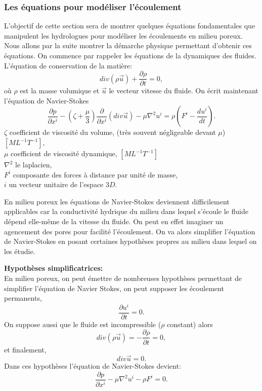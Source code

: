 \documentclass[a4paper,11pt]{article}
\numberwithin{equation}{section}
\begin{document}
\subsubsection{Les équations pour modéliser l'écoulement}
\label{ch: eq meca-flu}
L'objectif de cette section sera de montrer quelques équations fondamentales que manipulent les hydrologues pour modéliser les écoulements en milieu poreux. Nous allons par la suite montrer la démarche physique permettant d'obtenir ces équations. On commence par rappeler les équations de la dynamiques des fluides. L'équation de conservation de la matière:
\begin{equation}
	\label{cons-mat}
	div(\rho \overrightarrow{u})+\frac{\partial \rho}{\partial t}=0,
\end{equation}
où $\rho$ est la masse volumique et $\overrightarrow{u}$ le vecteur vitesse du fluide. On écrit maintenant l'équation de Navier-Stokes
\begin{equation}
	\frac{\partial p}{\partial x^i}-(\zeta+\frac{\mu}{3})\frac{\partial}{\partial x^i}(div\overrightarrow{u}) - \mu \nabla^2u^i=\rho(F^i -\frac{du^i}{dt}).
\end{equation}
$\zeta$ coefficient de viscosité du volume, (très souvent négligeable devant $\mu$) $[ML^{-1}T^{-1}]$,\\
$\mu$ coefficient de viscosité dynamique, $[ML^{-1}T^{-1}]$\\
$\nabla^2$ le laplacien,\\
$F^i$ composante des forces à distance par unité de masse,\\
$i$ un vecteur unitaire de l'espace $3D$.

En milieu poreux les équations de Navier-Stokes deviennent difficilement applicables car la conductivité hydrique du milieu dans lequel s'écoule le fluide dépend elle-même de la vitesse du fluide. On peut en effet imaginer un agencement des pores pour facilité l'écoulement. On va alors simplifier l'équation de Navier-Stokes en posant certaines hypothèses propres au milieu dans lequel on les étudie. 

\vspace{0.7cm}

\noindent \textbf{Hypothèses simplificatrices:}\\
En milieu poreux, on peut émettre de nombreuses hypothèses permettant de simplifier l'équation de Navier Stokes, on peut supposer les écoulement permanents,
\[\frac{\partial u^i}{\partial t}=0.\]
On suppose aussi que le fluide est incompressible ($\rho$ constant) alors
\[div(\rho \overrightarrow{u})=-\frac{\partial \rho}{\partial t}=0,\]
et finalement,
\[div \overrightarrow{u}=0.\]
Dans ces hypothèses l'équation de Navier-Stokes devient:
\begin{equation}
	\label{eq-cons-m-simp}
	\frac{\partial p}{\partial x^i}-\mu \nabla^2u^i-\rho F^i=0. 
\end{equation}
\end{document}
